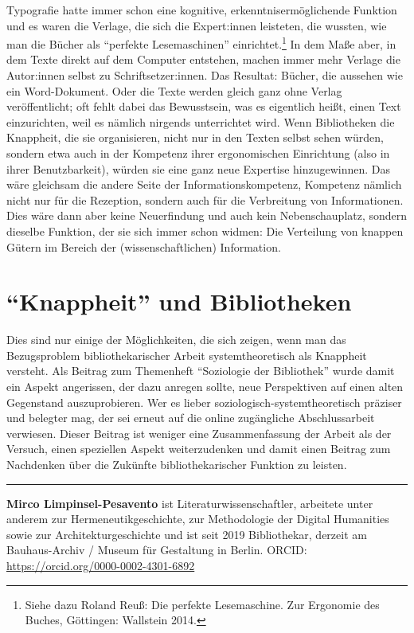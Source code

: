 \documentclass[a4paper,
fontsize=11pt,
oneside,
numbers=noperiodatend,
parskip=half-,
bibliography=totoc,
final
]{scrartcl}
\begin{document}
Typografie hatte immer schon eine kognitive, erkenntnisermöglichende
Funktion und es waren die Verlage, die sich die Expert:innen leisteten,
die wussten, wie man die Bücher als \enquote{perfekte Lesemaschinen}
einrichtet.\footnote{Siehe dazu Roland Reuß: Die perfekte Lesemaschine.
  Zur Ergonomie des Buches, Göttingen: Wallstein 2014.} In dem Maße
aber, in dem Texte direkt auf dem Computer entstehen, machen immer mehr
Verlage die Autor:innen selbst zu Schriftsetzer:innen. Das Resultat:
Bücher, die aussehen wie ein Word-Dokument. Oder die Texte werden gleich
ganz ohne Verlag veröffentlicht; oft fehlt dabei das Bewusstsein, was es
eigentlich heißt, einen Text einzurichten, weil es nämlich nirgends
unterrichtet wird. Wenn Bibliotheken die Knappheit, die sie
organisieren, nicht nur in den Texten selbst sehen würden, sondern etwa
auch in der Kompetenz ihrer ergonomischen Einrichtung (also in ihrer
Benutzbarkeit), würden sie eine ganz neue Expertise hinzugewinnen. Das
wäre gleichsam die andere Seite der Informationskompetenz, Kompetenz
nämlich nicht nur für die Rezeption, sondern auch für die Verbreitung
von Informationen. Dies wäre dann aber keine Neuerfindung und auch kein
Nebenschauplatz, sondern dieselbe Funktion, der sie sich immer schon
widmen: Die Verteilung von knappen Gütern im Bereich der
(wissenschaftlichen) Information.

\hypertarget{knappheit-und-bibliotheken}{%
\section{\texorpdfstring{\enquote{Knappheit} und
Bibliotheken}{``Knappheit'' und Bibliotheken}}\label{knappheit-und-bibliotheken}}

Dies sind nur einige der Möglichkeiten, die sich zeigen, wenn man das
Bezugsproblem bibliothekarischer Arbeit systemtheoretisch als Knappheit
versteht. Als Beitrag zum Themenheft \enquote{Soziologie der Bibliothek}
wurde damit ein Aspekt angerissen, der dazu anregen sollte, neue
Perspektiven auf einen alten Gegenstand auszuprobieren. Wer es lieber
soziologisch-systemtheoretisch präziser und belegter mag, der sei erneut
auf die online zugängliche Abschlussarbeit verwiesen. Dieser Beitrag ist
weniger eine Zusammenfassung der Arbeit als der Versuch, einen
speziellen Aspekt weiterzudenken und damit einen Beitrag zum Nachdenken
über die Zukünfte bibliothekarischer Funktion zu leisten.

\begin{center}\rule{0.5\linewidth}{0.5pt}\end{center}

\textbf{Mirco Limpinsel-Pesavento} ist Literaturwissenschaftler,
arbeitete unter anderem zur Hermeneutikgeschichte, zur Methodologie der
Digital Humanities sowie zur Architekturgeschichte und ist seit 2019
Bibliothekar, derzeit am Bauhaus-Archiv / Museum für Gestaltung in
Berlin. ORCID: \url{https://orcid.org/0000-0002-4301-6892}
\end{document}
